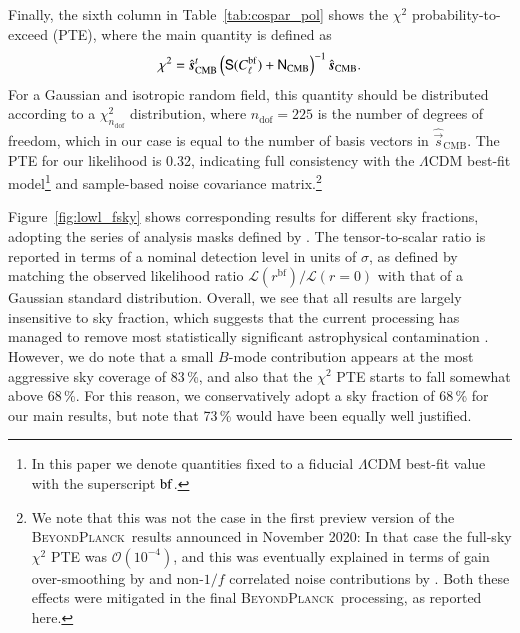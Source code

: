 \documentclass[twocolumn]{aa}
\newcommand{\s}[0]{\vec{s}}
\newcommand{\N}[0]{\tens{N}}
\renewcommand{\S}[0]{\tens{S}}
\newcommand{\BP}{\textsc{BeyondPlanck}}
\begin{document}
Finally, the sixth column in Table~\ref{tab:cospar_pol} shows the $\chi^2$
probability-to-exceed (PTE), where the main quantity is defined as
\begin{equation}
  \chi^2 = \hat{\s}_{\mathrm{CMB}}^t
  \left(\S(C_{\ell}^{\mathrm{bf}})+\N_{\mathrm{CMB}}\right)^{-1}\hat{\s}_{\mathrm{CMB}}.
\end{equation}
For a Gaussian and isotropic random field, this quantity should be
distributed according to a $\chi^2_{n_{\mathrm{dof}}}$ distribution,
where $n_{\mathrm{dof}}=225$ is the number of degrees of freedom,
which in our case is equal to the number of basis vectors in
$\hat{\s}_{\mathrm{CMB}}$. The PTE for our likelihood is 0.32,
indicating full consistency with the $\Lambda$CDM best-fit model\footnote{
In this paper we denote quantities fixed to a fiducial $\Lambda$CDM best-fit 
value with the superscript $\rm{bf}$.} 
and sample-based noise covariance matrix.\footnote{We note that this was
  not the case in the first preview version of the \BP\ results
  announced in November 2020: In that case the full-sky $\chi^2$ PTE
  was $\mathcal{O}(10^{-4})$, and this was eventually explained in
  terms of gain over-smoothing by \citet{bp07} and non-$1/f$
  correlated noise contributions by \citet{bp06}. Both these effects
  were mitigated in the final \BP\ processing, as reported here.}

Figure~\ref{fig:lowl_fsky} shows corresponding results for different
sky fractions, adopting the series of analysis masks defined by \citet{planck2016-l05}. The
tensor-to-scalar ratio is reported in terms of a nominal detection
level in units of $\sigma$, as defined by matching the observed
likelihood ratio $\mathcal{L}(r^{\mathrm{bf}})/\mathcal{L}(r=0)$ with
that of a Gaussian standard distribution. Overall, we see that all
results are largely insensitive to sky fraction, which suggests that
the current processing has managed to remove most statistically
significant astrophysical contamination \citep{bp13,bp14}. However, we do
note that a small $B$-mode contribution appears at the most aggressive
sky coverage of 83\,\%, and also that the $\chi^2$ PTE starts to fall
somewhat above 68\,\%. For this reason, we conservatively adopt a sky
fraction of 68\,\% for our main results, but note that 73\,\% would
have been equally well justified. 
\end{document}
